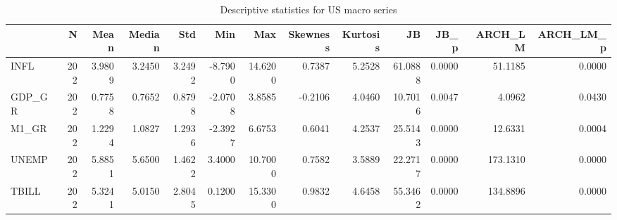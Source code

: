 \begin{table}
\caption{Descriptive statistics for US macro series}
\label{tab:desc}
\begin{tabular}{lrrrrrrrrrrrr}
\toprule
 & N & Mean & Median & Std & Min & Max & Skewness & Kurtosis & JB & JB_p & ARCH_LM & ARCH_LM_p \\
\midrule
INFL & 202 & 3.9809 & 3.2450 & 3.2492 & -8.7900 & 14.6200 & 0.7387 & 5.2528 & 61.0888 & 0.0000 & 51.1185 & 0.0000 \\
GDP_GR & 202 & 0.7758 & 0.7652 & 0.8798 & -2.0708 & 3.8585 & -0.2106 & 4.0460 & 10.7016 & 0.0047 & 4.0962 & 0.0430 \\
M1_GR & 202 & 1.2294 & 1.0827 & 1.2936 & -2.3927 & 6.6753 & 0.6041 & 4.2537 & 25.5143 & 0.0000 & 12.6331 & 0.0004 \\
UNEMP & 202 & 5.8851 & 5.6500 & 1.4622 & 3.4000 & 10.7000 & 0.7582 & 3.5889 & 22.2717 & 0.0000 & 173.1310 & 0.0000 \\
TBILL & 202 & 5.3241 & 5.0150 & 2.8045 & 0.1200 & 15.3300 & 0.9832 & 4.6458 & 55.3462 & 0.0000 & 134.8896 & 0.0000 \\
\bottomrule
\end{tabular}
\end{table}
